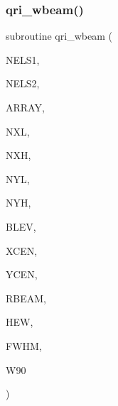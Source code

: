 \subsubsection{\texorpdfstring{qri\+\_\+wbeam()}{qri\_wbeam()}}
{\footnotesize\ttfamily subroutine qri\+\_\+wbeam (\begin{DoxyParamCaption}\item[{integer}]{N\+E\+L\+S1,  }\item[{integer}]{N\+E\+L\+S2,  }\item[{double precision, dimension(nels1,nels2)}]{A\+R\+R\+AY,  }\item[{integer}]{N\+XL,  }\item[{integer}]{N\+XH,  }\item[{integer}]{N\+YL,  }\item[{integer}]{N\+YH,  }\item[{double precision}]{B\+L\+EV,  }\item[{double precision}]{X\+C\+EN,  }\item[{double precision}]{Y\+C\+EN,  }\item[{double precision}]{R\+B\+E\+AM,  }\item[{double precision}]{H\+EW,  }\item[{double precision}]{F\+W\+HM,  }\item[{double precision}]{W90 }\end{DoxyParamCaption})}

